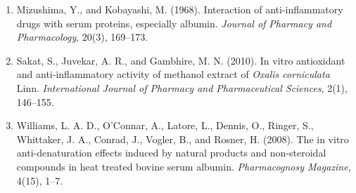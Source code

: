 \documentclass{comjnl}
\begin{document}
\begin{enumerate}

\item Mizushima, Y., and Kobayashi, M. (1968). 
Interaction of anti-inflammatory drugs with serum proteins, especially albumin. 
\textit{Journal of Pharmacy and Pharmacology}, 20(3), 169--173.

\item Sakat, S., Juvekar, A. R., and Gambhire, M. N. (2010). 
In vitro antioxidant and anti-inflammatory activity of methanol extract of \textit{Oxalis corniculata} Linn. 
\textit{International Journal of Pharmacy and Pharmaceutical Sciences}, 2(1), 146--155.

\item Williams, L. A. D., O'Connar, A., Latore, L., Dennis, O., Ringer, S., Whittaker, J. A., Conrad, J., Vogler, B., and Rosner, H. (2008). 
The in vitro anti-denaturation effects induced by natural products and non-steroidal compounds in heat treated bovine serum albumin. 
\textit{Pharmacognosy Magazine}, 4(15), 1--7.

\end{enumerate}
\end{document}
